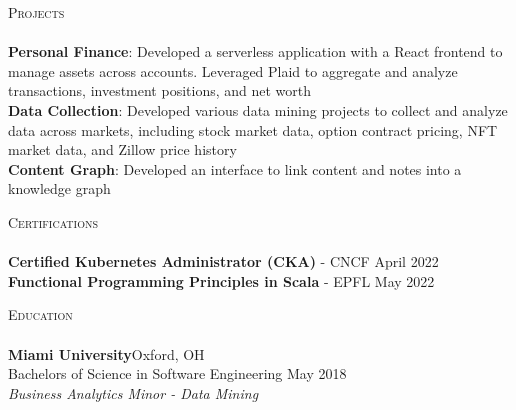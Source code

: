 \documentclass[a4paper]{article}
\newcommand{\lineunder} {
    \vspace*{-8pt} \\
    \hspace*{-18pt} \hrulefill \\
}
\newcommand{\header} [1] {
    {\hspace*{-18pt}\vspace*{6pt} \textsc{#1}}
    \vspace*{-6pt} \lineunder
}
\begin{document}
\header{Projects}
{\textbf{Personal Finance}}: Developed a serverless application with a React frontend to manage assets across accounts. Leveraged Plaid to aggregate and analyze transactions, investment positions, and net worth\\
\vspace*{1mm}
{\textbf{Data Collection}}: Developed various data mining projects to collect and analyze data across markets, including stock market data, option contract pricing, NFT market data, and Zillow price history\\
\vspace*{1mm}
{\textbf{Content Graph}}: Developed an interface to link content and notes into a knowledge graph\\
\vspace*{3mm}

\header{Certifications}
\textbf{Certified Kubernetes Administrator (CKA)} - CNCF \hfill April 2022\\
\vspace*{1mm}
\textbf{Functional Programming Principles in Scala} - EPFL \hfill May 2022\\
\vspace{3mm}

\header{Education}
\textbf{Miami University}\hfill Oxford, OH\\
Bachelors of Science in Software Engineering \hfill May 2018\\
\textit{Business Analytics Minor - Data Mining}\\

\ 
\end{document}
